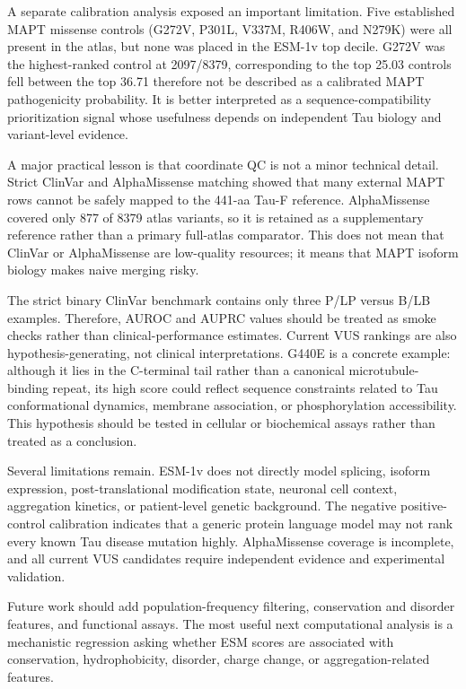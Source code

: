 \documentclass[11pt]{article}
\begin{document}
A separate calibration analysis exposed an important limitation. Five established
MAPT missense controls (G272V, P301L, V337M, R406W, and N279K) were all present in
the atlas, but none was placed in the ESM-1v top decile. G272V was the highest-ranked
control at 2097/8379, corresponding to the top 25.03%
controls fell between the top 36.71%
therefore not be described as a calibrated MAPT pathogenicity probability. It is
better interpreted as a sequence-compatibility prioritization signal whose usefulness
depends on independent Tau biology and variant-level evidence.

A major practical lesson is that coordinate QC is not a minor technical detail.
Strict ClinVar and AlphaMissense matching showed that many external MAPT rows
cannot be safely mapped to the 441-aa Tau-F reference. AlphaMissense covered only
877 of 8379 atlas variants, so it is retained as a supplementary reference rather
than a primary full-atlas comparator. This does not mean that ClinVar or
AlphaMissense are low-quality resources; it means that MAPT isoform biology makes
naive merging risky.

The strict binary ClinVar benchmark contains only three P/LP versus B/LB examples.
Therefore, AUROC and AUPRC values should be treated as smoke checks rather than
clinical-performance estimates. Current VUS rankings are also hypothesis-generating,
not clinical interpretations. G440E is a concrete example: although it lies in the
C-terminal tail rather than a canonical microtubule-binding repeat, its high score
could reflect sequence constraints related to Tau conformational dynamics, membrane
association, or phosphorylation accessibility. This hypothesis should be tested in
cellular or biochemical assays rather than treated as a conclusion.

Several limitations remain. ESM-1v does not directly model splicing, isoform
expression, post-translational modification state, neuronal cell context,
aggregation kinetics, or patient-level genetic background. The negative positive-
control calibration indicates that a generic protein language model may not rank
every known Tau disease mutation highly. AlphaMissense coverage is incomplete, and
all current VUS candidates require independent evidence and experimental validation.

Future work should add population-frequency filtering, conservation and disorder
features, and functional assays. The most useful next computational analysis is a
mechanistic regression asking whether ESM scores are associated with conservation,
hydrophobicity, disorder, charge change, or aggregation-related features.
\end{document}
